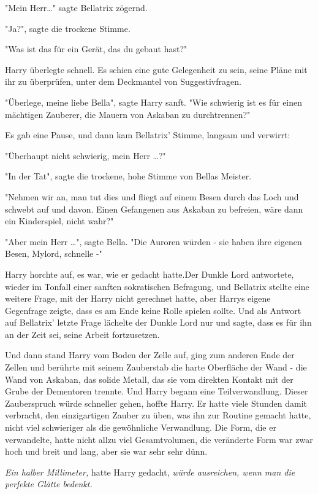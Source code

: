 {"Mein Herr…" sagte Bellatrix zögernd.

"Ja?", sagte die trockene Stimme.

"Was ist das für ein Gerät, das du gebaut hast?"

Harry überlegte schnell. Es schien eine gute Gelegenheit zu sein, seine Pläne mit ihr zu überprüfen, unter dem Deckmantel von Suggestivfragen.

"Überlege, meine liebe Bella", sagte Harry sanft. "Wie schwierig ist es für einen mächtigen Zauberer, die Mauern von Askaban zu durchtrennen?"

Es gab eine Pause, und dann kam Bellatrix' Stimme, langsam und verwirrt:

"Überhaupt nicht schwierig, mein Herr …?"

"In der Tat", sagte die trockene, hohe Stimme von Bellas Meister.

"Nehmen wir an, man tut dies und fliegt auf einem Besen durch das Loch und schwebt auf und davon. Einen Gefangenen aus Askaban zu befreien, wäre dann ein Kinderspiel, nicht wahr?"

"Aber mein Herr …", sagte Bella. "Die Auroren würden - sie haben ihre eigenen Besen, Mylord, schnelle -"

Harry horchte auf, es war, wie er gedacht hatte.Der Dunkle Lord antwortete, wieder im Tonfall einer sanften sokratischen Befragung, und Bellatrix stellte eine weitere Frage, mit der Harry nicht gerechnet hatte, aber Harrys eigene Gegenfrage zeigte, dass es am Ende keine Rolle spielen sollte. Und als Antwort auf Bellatrix' letzte Frage lächelte der Dunkle Lord nur und sagte, dass es für ihn an der Zeit sei, seine Arbeit fortzusetzen.

Und dann stand Harry vom Boden der Zelle auf, ging zum anderen Ende der Zellen und berührte mit seinem Zauberstab die harte Oberfläche der Wand - die Wand von Askaban, das solide Metall, das sie vom direkten Kontakt mit der Grube der Dementoren trennte. Und Harry begann eine Teilverwandlung. Dieser Zauberspruch würde schneller gehen, hoffte Harry. Er hatte viele Stunden damit verbracht, den einzigartigen Zauber zu üben, was ihn zur Routine gemacht hatte, nicht viel schwieriger als die gewöhnliche Verwandlung. Die Form, die er verwandelte, hatte nicht allzu viel Gesamtvolumen, die veränderte Form war zwar hoch und breit und lang, aber sie war sehr sehr dünn.

\emph{Ein halber Millimeter,} hatte Harry gedacht, \emph{würde ausreichen, wenn man die perfekte Glätte bedenkt.}

}
